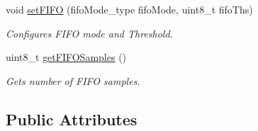 \begin{DoxyCompactItemize}
void \hyperlink{classLSM9DS1_a0ec4a93a34545af1acc336bae9b360f1}{set\+F\+I\+FO} (fifo\+Mode\+\_\+type fifo\+Mode, uint8\+\_\+t fifo\+Ths)
\begin{DoxyCompactList}\small\item\em Configures F\+I\+FO mode and Threshold. \end{DoxyCompactList}\item 
uint8\+\_\+t \hyperlink{classLSM9DS1_ac03ef2ff928a25c4a80af7707cd92dc8}{get\+F\+I\+F\+O\+Samples} ()
\begin{DoxyCompactList}\small\item\em Gets number of F\+I\+FO samples. \end{DoxyCompactList}\end{DoxyCompactItemize}
\subsection*{Public Attributes}
